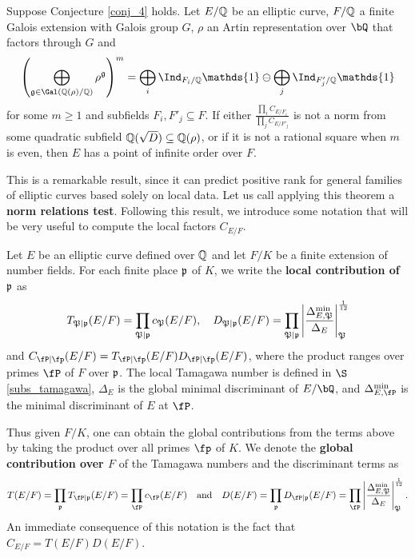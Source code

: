 \begin{thm}\cite[Theorem 33]{DEW1} \label{thm_positive_rank}
    Suppose Conjecture \ref{conj_4} holds. Let $E/\mathbb{Q}$ be an elliptic curve, $F/\mathbb{Q}$ a finite Galois extension with Galois group $G$, $\rho$ an Artin representation over $\bQ$ that factors through $G$ and 
    $$\left(\bigoplus_{\mathfrak{g}\in\Gal(\QQ(\rho)/\QQ)}\rho^{\mathfrak{g}}\right)^m=\bigoplus_i\Ind_{F_i/\QQ}\mathds{1}\ominus\bigoplus_j\Ind_{F'_j/\QQ}\mathds{1}$$
    for some $m\geq 1$ and subfields $F_i,F'_j\subseteq F$. If either $\frac{\prod_i C_{E/F_i}}{\prod_j C_{E/F'_j}}$ is not a norm from some quadratic subfield $\mathbb{Q}(\sqrt{D})\subseteq\mathbb{Q}(\rho)$, or if it is not a rational square when $m$ is even, then $E$ has a point of infinite order over $F$.
\end{thm}

This is a remarkable result, since it can predict positive rank for general families of elliptic curves based solely on local data. Let us call applying this theorem a \textbf{norm relations test}.
Following this result, we introduce some notation that will be very useful to compute the local factors $C_{E/F}$.

\begin{notation}\label{not_contr}
    Let $E$ be an elliptic curve defined over $\mathbb{Q}$ and let $F/K$ be a finite extension of number fields. For each finite place $\mathfrak{p}$ of $K$, we write the \textbf{local contribution of $\mathfrak{p}$} as 
    $$T_{\mathfrak{P}\mid\mathfrak{p}}(E/F)=\prod_{\mathfrak{P}\mid\mathfrak{p}}c_\mathfrak{P}(E/F),\quad D_{\mathfrak{P}\mid\mathfrak{p}}(E/F)=\prod_{\mathfrak{P}\mid\mathfrak{p}}\left|\frac{\Delta_{E,\mathfrak{P}}^{\min}}{\Delta_E}\right|_\mathfrak{P}^{\frac{1}{12}}$$ 
    and $C_{\fP\mid\fp}(E/F)=T_{\fP\mid\fp}(E/F)D_{\fP\mid\fp}(E/F)$, where the product ranges over primes $\fP$ of $F$ over $\mathfrak{p}$. The local Tamagawa number is defined in $\S$\ref{subs_tamagawa}, $\Delta_E$ is the global minimal discriminant of $E / \bQ$, and $\Delta_{E, \fP}^{\min}$ is the minimal discriminant of $E$ at $\fP$. 

    Thus given $F / K$, one can obtain the global contributions from the terms above by taking the product over all primes $\fp$ of $K$. We denote the \textbf{global contribution over $F$} of the Tamagawa numbers and the discriminant terms as 
    $$T(E/F)=\prod_\pp T_{\fP\mid\pp}(E/F)=\prod_\fP c_\fP(E/F)\quad\text{and}\quad D(E/F)=\prod_\pp D_{\fP\mid\pp}(E/F)=\prod_\fP \left|\frac{\Delta_{E,\mathfrak{P}}^{\min}}{\Delta_E}\right|_\mathfrak{P}^{\frac{1}{12}}.$$ 
An immediate consequence of this notation is the fact that $C_{E/F}=T(E/F)D(E/F)$.
\end{notation}

